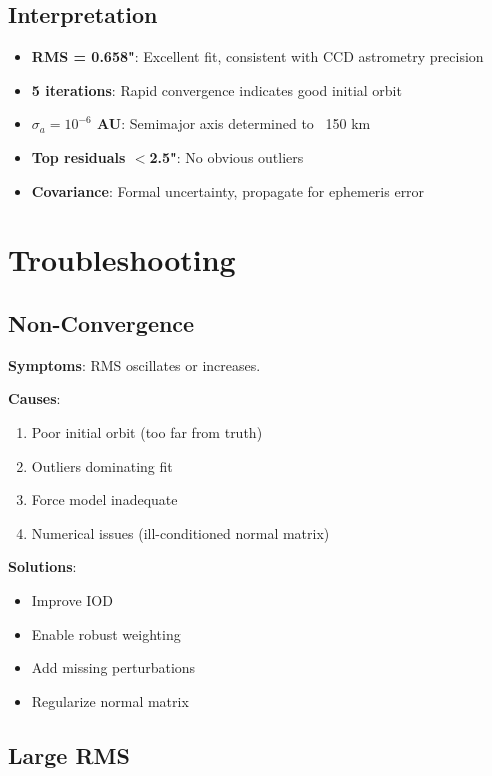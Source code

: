 \subsection{Interpretation}

\begin{itemize}
    \item \textbf{RMS = 0.658"}: Excellent fit, consistent with CCD astrometry precision
    \item \textbf{5 iterations}: Rapid convergence indicates good initial orbit
    \item \textbf{$\sigma_a = 10^{-6}$ AU}: Semimajor axis determined to ~150 km
    \item \textbf{Top residuals $<$2.5"}: No obvious outliers
    \item \textbf{Covariance}: Formal uncertainty, propagate for ephemeris error
\end{itemize}

\section{Troubleshooting}

\subsection{Non-Convergence}

\textbf{Symptoms}: RMS oscillates or increases.

\textbf{Causes}:
\begin{enumerate}
    \item Poor initial orbit (too far from truth)
    \item Outliers dominating fit
    \item Force model inadequate
    \item Numerical issues (ill-conditioned normal matrix)
\end{enumerate}

\textbf{Solutions}:
\begin{itemize}
    \item Improve IOD
    \item Enable robust weighting
    \item Add missing perturbations
    \item Regularize normal matrix
\end{itemize}

\subsection{Large RMS}


